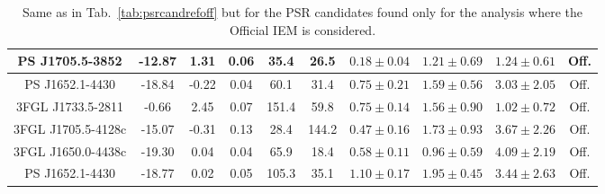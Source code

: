 \begin{table*}
\begin{tabular}{|c|c|c|c|c|c|c|c|c|c|}
 PS J1705.5-3852 & -12.87 & 1.31 & 0.06 & 35.4 & 26.5 & $0.18\pm0.04$ & $1.21\pm0.69$ & $1.24\pm0.61$ & Off. \\
\hline 
 PS J1652.1-4430 & -18.84 & -0.22 & 0.04 & 60.1 & 31.4 & $0.75\pm0.21$ & $1.59\pm0.56$ & $3.03\pm2.05$ & Off. \\
\hline 
 3FGL J1733.5-2811 & -0.66 & 2.45 & 0.07 & 151.4 & 59.8 & $0.75\pm0.14$ & $1.56\pm0.90$ & $1.02\pm0.72$ & Off. \\
\hline 
 3FGL J1705.5-4128c & -15.07 & -0.31 & 0.13 & 28.4 & 144.2 & $0.47\pm0.16$ & $1.73\pm0.93$ & $3.67\pm2.26$ & Off. \\
\hline 
 3FGL J1650.0-4438c & -19.30 & 0.04 & 0.04 & 65.9 & 18.4 & $0.58\pm0.11$ & $0.96\pm0.59$ & $4.09\pm2.19$ & Off. \\
\hline 
 PS J1652.1-4430 & -18.77 & 0.02 & 0.05 & 105.3 & 35.1 & $1.10\pm0.17$ & $1.95\pm0.45$ & $3.44\pm2.63$ & Off. \\
\hline 
\hline 
\end{tabular}
\caption{Same as in Tab.~\ref{tab:psrcandrefoff} but for the PSR candidates found only for the analysis where the Official IEM is considered.}
\label{tab:psrcandoff}
\end{table*}


